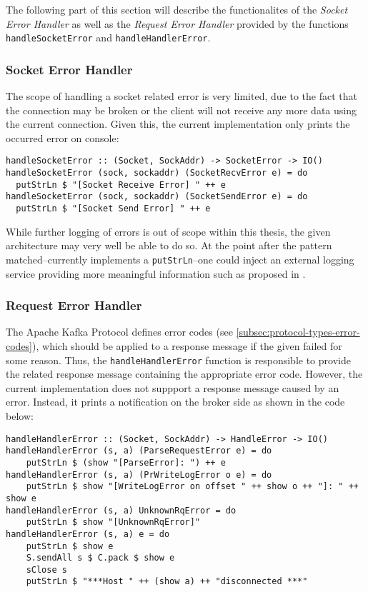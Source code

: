 The following part of this section will describe the functionalites of the
\textit{Socket Error Handler} as well as the \textit{Request Error Handler}
provided by the functions \lstinline{handleSocketError} and
\lstinline{handleHandlerError}.

\subsubsection{Socket Error Handler}

The scope of handling a socket related error is very limited, due to the fact
that the connection may be broken or the client will not receive any more data
using the current connection. Given this, the current implementation only
prints the occurred error on console:

\begin{lstlisting}[caption={Handling error of type SocketError}]
handleSocketError :: (Socket, SockAddr) -> SocketError -> IO()
handleSocketError (sock, sockaddr) (SocketRecvError e) = do
  putStrLn $ "[Socket Receive Error] " ++ e
handleSocketError (sock, sockaddr) (SocketSendError e) = do
  putStrLn $ "[Socket Send Error] " ++ e
\end{lstlisting}

While further logging of errors is out of scope within this thesis, the given
architecture may very well be able to do so. At the point after the pattern
matched--currently implements a \lstinline{putStrLn}--one
could inject an external logging service providing more meaningful information
such as proposed in .

\subsubsection{Request Error Handler}

The Apache Kafka Protocol defines error codes (see
\ref{subsec:protocol-types-error-codes}), which should be applied to a response
message if the given failed for some reason. Thus, the
\lstinline{handleHandlerError} function is responsible to provide the related
response message containing the appropriate error code. However, the current
implementation does not suppport a response message caused by an error. Instead,
it prints a notification on the broker side as shown in the code below:

\begin{lstlisting}[caption={Handling error of type HandleError}]
handleHandlerError :: (Socket, SockAddr) -> HandleError -> IO()
handleHandlerError (s, a) (ParseRequestError e) = do
    putStrLn $ (show "[ParseError]: ") ++ e
handleHandlerError (s, a) (PrWriteLogError o e) = do
    putStrLn $ show "[WriteLogError on offset " ++ show o ++ "]: " ++ show e
handleHandlerError (s, a) UnknownRqError = do
    putStrLn $ show "[UnknownRqError]"
handleHandlerError (s, a) e = do
    putStrLn $ show e
    S.sendAll s $ C.pack $ show e
    sClose s
    putStrLn $ "***Host " ++ (show a) ++ "disconnected ***"
\end{lstlisting}

